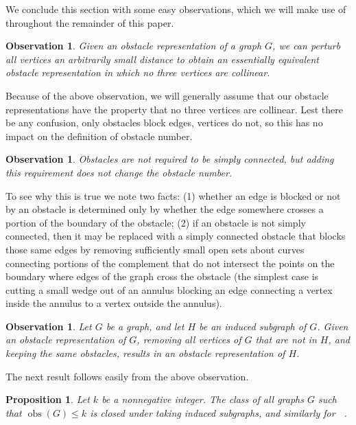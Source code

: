 \documentclass[12pt]{amsart}
\newtheorem{proposition}[theorem]{Proposition}
\newtheorem{observation}[theorem]{Observation}
\theoremstyle{remark}
\DeclareMathOperator{\obs}{\ensuremath{\mathrm{obs}}}
\DeclareMathOperator{\obsout}{\ensuremath{\obs_\mathrm{out}}}
\begin{document}
We conclude this section with some easy observations,
which we will make use of throughout the remainder of this paper.

\begin{observation} \label{O:perturb}
Given an obstacle representation of a graph $G$,
we can perturb all vertices an arbitrarily small distance
to obtain an essentially equivalent obstacle representation
in which no three vertices are collinear.
\end{observation}

Because of the above observation,
we will generally assume that our obstacle representations
have the property that no three vertices are collinear. Lest there be any confusion, only obstacles block edges, vertices do not, so this has no impact on the definition of obstacle number.
\begin{observation}\label{O:simplyconnected} Obstacles
are not required
to be simply connected,
but adding this requirement
does not change the obstacle number.\end{observation}
To see why this is true we note two facts: (1) whether an edge is blocked or not by an obstacle is determined only by whether the edge somewhere crosses a portion of the boundary of the obstacle; (2) if an obstacle is not simply connected, 
then
it may be replaced with a simply connected obstacle that blocks those same edges by removing sufficiently small open sets about curves connecting portions of the complement that do not intersect the points on the boundary where edges of the graph cross the obstacle (the simplest case is cutting a small wedge out of an annulus blocking an edge connecting a vertex inside the annulus to a vertex outside the annulus). 

\begin{observation} \label{O:induced}
Let $G$ be a graph,
and let $H$ be an induced subgraph of $G$.
Given an obstacle representation of $G$,
removing all vertices of $G$ that are not in $H$,
and keeping the same obstacles, results
in an obstacle representation of $H$.\end{observation}

The next result follows easily from the above observation.

\begin{proposition} \label{P:closed-induced}
Let $k$ be a nonnegative integer.
The class of all graphs $G$ such that $\obs(G)\le k$
is closed under taking induced subgraphs,
and similarly for
$\obsout$.
\end{proposition}
\end{document}
